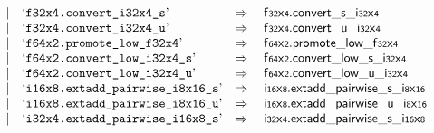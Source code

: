 $$\begin{array}[t]{@{}lrrl@{}l@{}l@{}l@{}}
& & | & \mbox{‘\texttt{f32x4.convert\_i32x4\_s}’} & \quad\Rightarrow\quad{} & {\mathsf{f{\scriptstyle 32}}}{\mathsf{x}}{\mathsf{{\scriptstyle 4}}} {.} {{\mathsf{convert}}{\mathsf{\_}}{\mathsf{s}}}{\mathsf{\_}}{{\mathsf{i{\scriptstyle 32}}}{\mathsf{x}}{\mathsf{{\scriptstyle 4}}}} \\
& & | & \mbox{‘\texttt{f32x4.convert\_i32x4\_u}’} & \quad\Rightarrow\quad{} & {\mathsf{f{\scriptstyle 32}}}{\mathsf{x}}{\mathsf{{\scriptstyle 4}}} {.} {{\mathsf{convert}}{\mathsf{\_}}{\mathsf{u}}}{\mathsf{\_}}{{\mathsf{i{\scriptstyle 32}}}{\mathsf{x}}{\mathsf{{\scriptstyle 4}}}} \\
& & | & \mbox{‘\texttt{f64x2.promote\_low\_f32x4}’} & \quad\Rightarrow\quad{} & {\mathsf{f{\scriptstyle 64}}}{\mathsf{x}}{\mathsf{{\scriptstyle 2}}} {.} {{\mathsf{promote}}{\mathsf{\_}}{\mathsf{low}}}{\mathsf{\_}}{{\mathsf{f{\scriptstyle 32}}}{\mathsf{x}}{\mathsf{{\scriptstyle 4}}}} \\
& & | & \mbox{‘\texttt{f64x2.convert\_low\_i32x4\_s}’} & \quad\Rightarrow\quad{} & {\mathsf{f{\scriptstyle 64}}}{\mathsf{x}}{\mathsf{{\scriptstyle 2}}} {.} {{\mathsf{convert}}{\mathsf{\_}}{\mathsf{low}}{\mathsf{\_}}{\mathsf{s}}}{\mathsf{\_}}{{\mathsf{i{\scriptstyle 32}}}{\mathsf{x}}{\mathsf{{\scriptstyle 4}}}} \\
& & | & \mbox{‘\texttt{f64x2.convert\_low\_i32x4\_u}’} & \quad\Rightarrow\quad{} & {\mathsf{f{\scriptstyle 64}}}{\mathsf{x}}{\mathsf{{\scriptstyle 2}}} {.} {{\mathsf{convert}}{\mathsf{\_}}{\mathsf{low}}{\mathsf{\_}}{\mathsf{u}}}{\mathsf{\_}}{{\mathsf{i{\scriptstyle 32}}}{\mathsf{x}}{\mathsf{{\scriptstyle 4}}}} \\
& & | & \mbox{‘\texttt{i16x8.extadd\_pairwise\_i8x16\_s}’} & \quad\Rightarrow\quad{} & {\mathsf{i{\scriptstyle 16}}}{\mathsf{x}}{\mathsf{{\scriptstyle 8}}} {.} {{\mathsf{extadd\_pairwise}}{\mathsf{\_}}{\mathsf{s}}}{\mathsf{\_}}{{\mathsf{i{\scriptstyle 8}}}{\mathsf{x}}{\mathsf{{\scriptstyle 16}}}} \\
& & | & \mbox{‘\texttt{i16x8.extadd\_pairwise\_i8x16\_u}’} & \quad\Rightarrow\quad{} & {\mathsf{i{\scriptstyle 16}}}{\mathsf{x}}{\mathsf{{\scriptstyle 8}}} {.} {{\mathsf{extadd\_pairwise}}{\mathsf{\_}}{\mathsf{u}}}{\mathsf{\_}}{{\mathsf{i{\scriptstyle 8}}}{\mathsf{x}}{\mathsf{{\scriptstyle 16}}}} \\
& & | & \mbox{‘\texttt{i32x4.extadd\_pairwise\_i16x8\_s}’} & \quad\Rightarrow\quad{} & {\mathsf{i{\scriptstyle 32}}}{\mathsf{x}}{\mathsf{{\scriptstyle 4}}} {.} {{\mathsf{extadd\_pairwise}}{\mathsf{\_}}{\mathsf{s}}}{\mathsf{\_}}{{\mathsf{i{\scriptstyle 16}}}{\mathsf{x}}{\mathsf{{\scriptstyle 8}}}} \\

\end{array}$$
